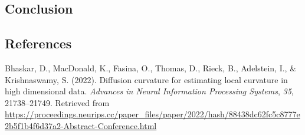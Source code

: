 \documentclass[
]{agujournal2019}
\newlength{\cslhangindent}
\newenvironment{CSLReferences}[2] %
 {\begin{list}{}{%
  \setlength{\itemindent}{0pt}
  \setlength{\leftmargin}{0pt}
  \setlength{\parsep}{0pt}
  \ifodd #1
   \setlength{\leftmargin}{\cslhangindent}
   \setlength{\itemindent}{-1\cslhangindent}
  \fi
  \setlength{\itemsep}{#2\baselineskip}}}
 {\end{list}}
\begin{document}
\subsection{Conclusion}\label{conclusion}

\subsection*{References}\label{references}

\label{refs}
\begin{CSLReferences}{1}{0}
\vspace{1em}

Bhaskar, D., MacDonald, K., Fasina, O., Thomas, D., Rieck, B.,
Adelstein, I., \& Krishnaswamy, S. (2022). Diffusion curvature for
estimating local curvature in high dimensional data. \emph{Advances in
Neural Information Processing Systems}, \emph{35}, 21738--21749.
Retrieved from
\url{https://proceedings.neurips.cc/paper_files/paper/2022/hash/88438dc62fc5c8777e2b5f1b4f6d37a2-Abstract-Conference.html}

\end{CSLReferences}
\end{document}
